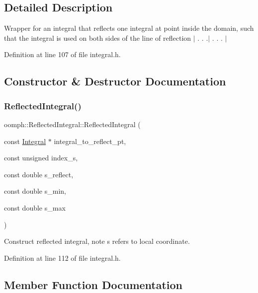 \subsection{Detailed Description}
Wrapper for an integral that reflects one integral at point inside the domain, such that the integral is used on both sides of the line of reflection $\vert$ . . .$\vert$ . . . $\vert$ 

Definition at line 107 of file integral.\+h.



\subsection{Constructor \& Destructor Documentation}
\mbox{\label{classoomph_1_1ReflectedIntegral_af915034fdc52963d3f177be829e6ef1a}} 
\subsubsection{\texorpdfstring{Reflected\+Integral()}{ReflectedIntegral()}}
{\footnotesize\ttfamily oomph\+::\+Reflected\+Integral\+::\+Reflected\+Integral (\begin{DoxyParamCaption}\item[{const \hyperlink{classoomph_1_1Integral}{Integral} $\ast$}]{integral\+\_\+to\+\_\+reflect\+\_\+pt,  }\item[{const unsigned}]{index\+\_\+s,  }\item[{const double}]{s\+\_\+reflect,  }\item[{const double}]{s\+\_\+min,  }\item[{const double}]{s\+\_\+max }\end{DoxyParamCaption})\hspace{0.3cm}{\ttfamily [inline]}}



Construct reflected integral, note s refers to local coordinate. 



Definition at line 112 of file integral.\+h.



\subsection{Member Function Documentation}
\mbox{\label{classoomph_1_1ReflectedIntegral_ac8500d64678b3477335ef639716f7cbe}} 
